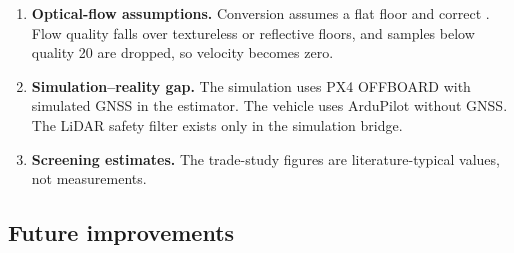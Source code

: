 \begin{enumerate}[leftmargin=*,itemsep=2pt]
  \item \textbf{Optical-flow assumptions.} Conversion assumes a flat floor and correct
    . Flow quality falls over textureless or reflective floors,
    and samples below quality 20 are dropped, so velocity becomes zero.
  \item \textbf{Simulation--reality gap.} The simulation uses PX4 OFFBOARD with
    simulated GNSS in the estimator. The vehicle uses ArduPilot  without
    GNSS. The LiDAR safety filter exists only in the simulation bridge.
  \item \textbf{Screening estimates.} The trade-study figures are literature-typical
    values, not measurements.
\end{enumerate}

\subsection{Future improvements}

